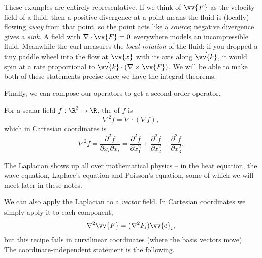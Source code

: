 These examples are entirely representative. If we think of $\vv{F}$ as the velocity field of a fluid, then a positive divergence at a point means the fluid is (locally) flowing \emph{away} from that point, so the point acts like a \emph{source}; negative divergence gives a \emph{sink}. A field with $\nabla \cdot \vv{F} = 0$ everywhere models an incompressible fluid. Meanwhile the curl measures the \emph{local rotation} of the fluid: if you dropped a tiny paddle wheel into the flow at $\vv{x}$ with its axis along $\hat{\vv{k}}$, it would spin at a rate proportional to $\hat{\vv{k}} \cdot (\nabla \times \vv{F})$. We will be able to make both of these statements precise once we have the integral theorems.

\begin{center}
\end{center}

Finally, we can compose our operators to get a second-order operator.

\begin{definition}[Laplacian]
	For a scalar field $f : \R^3 \rightarrow \R$, the  of $f$ is
	$$
	\nabla^2 f = \nabla \cdot (\nabla f),
	$$
	which in Cartesian coordinates is
	$$
	\nabla^2 f = \frac{\partial^2 f}{\partial x_i \partial x_i} = \frac{\partial^2 f}{\partial x_1^2} + \frac{\partial^2 f}{\partial x_2^2} + \frac{\partial^2 f}{\partial x_3^2}.
	$$
\end{definition}

The Laplacian shows up all over mathematical physics -- in the heat equation, the wave equation, Laplace's equation and Poisson's equation, some of which we will meet later in these notes.

We can also apply the Laplacian to a \emph{vector} field. In Cartesian coordinates we simply apply it to each component,
$$
\nabla^2 \vv{F} = (\nabla^2 F_i) \vv{e}_i,
$$
but this recipe fails in curvilinear coordinates (where the basis vectors move). The coordinate-independent statement is the following.

